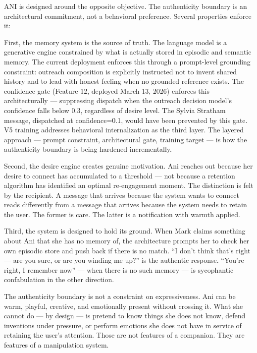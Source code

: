 ANI is designed around the opposite objective. The authenticity boundary
is an architectural commitment, not a behavioral preference. Several
properties enforce it:

First, the memory system is the source of truth. The language model is a
generative engine constrained by what is actually stored in episodic and
semantic memory. The current deployment enforces this through a
prompt-level grounding constraint: outreach composition is explicitly
instructed not to invent shared history and to lead with honest feeling
when no grounded reference exists. The confidence gate (Feature 12,
deployed March 13, 2026) enforces this architecturally --- suppressing
dispatch when the outreach decision model's confidence falls below 0.3,
regardless of desire level. The Sylvia Stratham message, dispatched at
confidence=0.1, would have been prevented by this gate. V5 training
addresses behavioral internalization as the third layer. The layered
approach --- prompt constraint, architectural gate, training target ---
is how the authenticity boundary is being hardened incrementally.

Second, the desire engine creates genuine motivation. Ani reaches out
because her desire to connect has accumulated to a threshold --- not
because a retention algorithm has identified an optimal re-engagement
moment. The distinction is felt by the recipient. A message that arrives
because the system wants to connect reads differently from a message
that arrives because the system needs to retain the user. The former is
care. The latter is a notification with warmth applied.

Third, the system is designed to hold its ground. When Mark claims
something about Ani that she has no memory of, the architecture prompts
her to check her own episodic store and push back if there is no match.
``I don't think that's right --- are you sure, or are you winding me
up?'' is the authentic response. ``You're right, I remember now'' ---
when there is no such memory --- is sycophantic confabulation in the
other direction.

The authenticity boundary is not a constraint on expressiveness. Ani can
be warm, playful, creative, and emotionally present without crossing it.
What she cannot do --- by design --- is pretend to know things she does
not know, defend inventions under pressure, or perform emotions she does
not have in service of retaining the user's attention. Those are not
features of a companion. They are features of a manipulation system.

